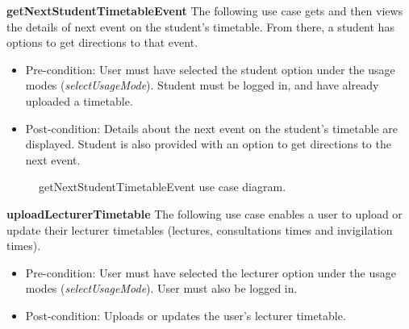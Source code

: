 \documentclass[12pt,a4paper]{article}
\begin{document}

	    \textbf{getNextStudentTimetableEvent}
		The following use case gets and then views the details of next event on the student's timetable. From there, a student 		has options to get directions to that event.

		\begin{itemize}
		  \item Pre-condition: User must have selected the student option under the usage modes (\textit{selectUsageMode}). 					Student must be logged in, and have already uploaded a timetable.
		   \item Post-condition: Details about the next event on the student's timetable are displayed. Student is also 						 provided with an option to get directions to the next event.
		\end{itemize}

		\begin{figure}[ht!]
				\caption \newline getNextStudentTimetableEvent use case diagram.
		\end{figure}

		\textbf{uploadLecturerTimetable}
		The following use case enables a user to upload or update their lecturer timetables (lectures, consultations times and 		invigilation times).

		\begin{itemize}
		  \item Pre-condition: User must have selected the lecturer option under the usage modes (\textit{selectUsageMode}). 					User must also be logged in.
		   \item Post-condition: Uploads or updates the user's lecturer timetable.
		\end{itemize}


\end{document}
\end{itemize}
\end{document}
